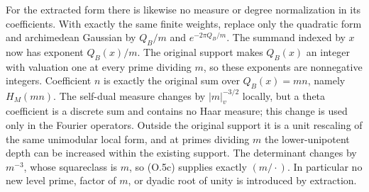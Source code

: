 For the extracted form there is likewise no measure or degree
normalization in its coefficients. With exactly the same finite
weights, replace only the quadratic form and archimedean Gaussian
by $Q_B/m$ and $e^{-2\pi Q_B/m}$. The summand indexed by $x$ now
has exponent $Q_B(x)/m$. The original support makes $Q_B(x)$ an
integer with valuation one at every prime dividing $m$, so these
exponents are nonnegative integers. Coefficient $n$ is exactly
the original sum over $Q_B(x)=mn$, namely $H_M(mn)$.
The self-dual measure changes by $|m|_v^{-3/2}$ locally, but a
theta coefficient is a discrete sum and contains no Haar
measure; this change is used only in the Fourier operators.
Outside the original support it is a unit rescaling of the same
unimodular local form, and at primes dividing $m$ the
lower-unipotent depth can be increased within the existing
support. The determinant changes by $m^{-3}$, whose squareclass
is $m$, so (O.5c) supplies exactly $(m/\cdot)$.
In particular no new level prime, factor of $m$, or dyadic
root of unity is introduced by extraction.


